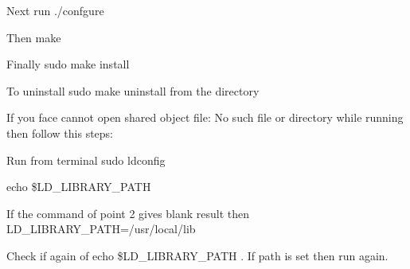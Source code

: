 \begin{DoxyEnumerate}
\item Next run {\ttfamily ./confgure}
\item Then {\ttfamily make}
\item Finally {\ttfamily sudo make install}
\end{DoxyEnumerate}
\begin{DoxyEnumerate}
\item To uninstall {\ttfamily sudo make uninstall} from the directory
\end{DoxyEnumerate}

If you face {\ttfamily cannot open shared object file\+: No such file or directory} while running then follow this steps\+:


\begin{DoxyEnumerate}
\item Run from terminal {\ttfamily sudo ldconfig}
\item {\ttfamily echo \$\+L\+D\+\_\+\+L\+I\+B\+R\+A\+R\+Y\+\_\+\+P\+A\+TH}
\item If the command of point 2 gives blank result then {\ttfamily L\+D\+\_\+\+L\+I\+B\+R\+A\+R\+Y\+\_\+\+P\+A\+TH=/usr/local/lib}
\item Check if again of {\ttfamily echo \$\+L\+D\+\_\+\+L\+I\+B\+R\+A\+R\+Y\+\_\+\+P\+A\+TH} . If path is set then run again. 
\end{DoxyEnumerate}